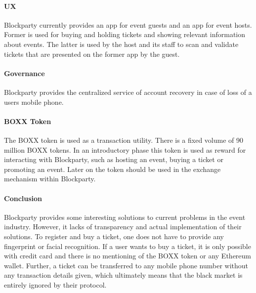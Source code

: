 \paragraph{UX} Blockparty currently provides an app for event guests and an app for event hosts. Former is used for buying and holding tickets and showing relevant information about events. The latter is used by the host and its staff to scan and validate tickets that are presented on the former app by the guest.

\paragraph{Governance} Blockparty provides the centralized service of account recovery in case of loss of a users mobile phone.

\paragraph{BOXX Token} The BOXX token is used as a transaction utility. There is a fixed volume of 90 million BOXX tokens. In an introductory phase this token is used as reward for interacting with Blockparty, such as hosting an event, buying a ticket or promoting an event. Later on the token should be used in the exchange mechanism within Blockparty.

\paragraph{Conclusion} Blockparty provides some interesting solutions to current problems in the event industry. However, it lacks of transparency and actual implementation of their solutions. To register and buy a ticket, one does not have to provide any fingerprint or facial recognition. If a user wants to buy a ticket, it is only possible with credit card and there is no mentioning of the BOXX token or any Ethereum wallet. Further, a ticket can be transferred to any mobile phone number without any transaction details given, which ultimately means that the black market is entirely ignored by their protocol.

